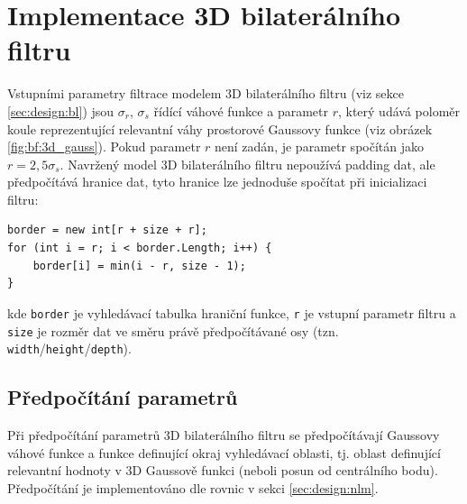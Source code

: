 \pagebreak

\section{Implementace 3D bilaterálního filtru}
\label{sec:impl:bl}
Vstupními parametry filtrace modelem 3D bilaterálního filtru (viz sekce \ref{sec:design:bl}) jsou $\sigma_r$, $\sigma_s$ řídící váhové funkce a parametr $r$, který udává poloměr koule reprezentující relevantní váhy prostorové Gaussovy funkce (viz obrázek \ref{fig:bf:3d_gauss}). Pokud parametr $r$ není zadán, je parametr spočítán jako $r=2,5\sigma_s$. Navržený model 3D bilaterálního filtru nepoužívá padding dat, ale předpočítává hranice dat, tyto hranice lze jednoduše spočítat při inicializaci filtru:
\begin{verbatim}
border = new int[r + size + r];
for (int i = r; i < border.Length; i++) {
    border[i] = min(i - r, size - 1);
}
\end{verbatim} 
kde \texttt{border} je vyhledávací tabulka hraniční funkce, \texttt{r} je vstupní parametr filtru a \texttt{size} je rozměr dat ve směru právě předpočítávané osy (tzn. \texttt{width}/\texttt{height}/\texttt{depth}).

\subsection*{Předpočítání parametrů}
Při předpočítání parametrů 3D bilaterálního filtru se předpočítávají Gaussovy váhové funkce a funkce definující okraj vyhledávací oblasti, tj. oblast definující relevantní hodnoty v 3D Gaussově funkci (neboli posun od centrálního bodu). Předpočítání je implementováno dle rovnic v sekci \ref{sec:design:nlm}.

